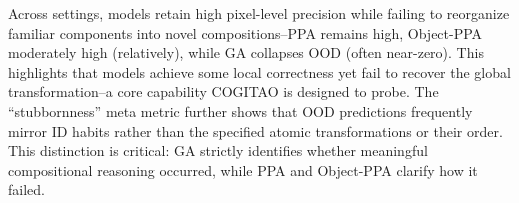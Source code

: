 Across settings, models retain high pixel-level precision while failing to reorganize familiar components into novel compositions--PPA remains high, Object-PPA moderately high (relatively), while GA collapses OOD (often near-zero). This highlights that models achieve some local correctness yet fail to recover the global transformation--a core capability COGITAO is designed to probe. The “stubbornness” meta metric further shows that OOD predictions frequently mirror ID habits rather than the specified atomic transformations or their order. This distinction is critical: GA strictly identifies whether meaningful compositional reasoning occurred, while PPA and Object-PPA clarify how it failed.


